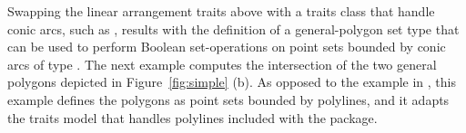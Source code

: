 Swapping the linear arrangement traits 
above with a traits class that handle conic arcs, such as
, results with the definition of a
general-polygon set type that can be used to perform Boolean 
set-operations on point sets bounded by conic arcs of type
. The next example computes the intersection of the
two general polygons depicted in Figure~\ref{fig:simple} (b). As opposed
to the example in , this example defines the
polygons as point sets bounded by polylines, and it adapts the traits 
model that handles polylines included with the 
package.

